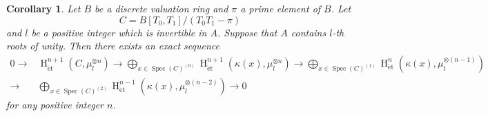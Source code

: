 \documentclass{article}
\newtheorem{cor}[thm]{\indent \sc Corollary}
\newcommand{\spec}{\operatorname{Spec}}
\newcommand{\et}{\mathrm{\acute{e}t}}
\newcommand{\HO}{\operatorname{H}}
\begin{document}
%
\begin{cor}\upshape
Let $B$ be a discrete valuation ring 
and $\pi$ a prime element of $B$.
Let
%
\begin{equation*}
C=B[T_{0}, T_{1}]/(
T_{0}T_{1}-\pi
)    
\end{equation*}
%
and $l$ be a positive integer which is
invertible in $A$.
Suppose that $A$ contains $l$-th roots of unity.
Then there exists an exact sequence
%
\begin{align*}
0\to  
&\HO^{n+1}_{\et}(
C, \mu_{l}^{\otimes n}
)
\to
\displaystyle\bigoplus_{x\in \spec(C)^{(0)}}
\HO^{n+1}_{\et}(
\kappa(x), 
\mu_{l}^{\otimes n}
)
\to
\displaystyle\bigoplus_{x\in \spec(C)^{(1)}}
\HO^{n}_{\et}(
\kappa(x), 
\mu_{l}^{\otimes (n-1)}
)
\\
\to
&\displaystyle\bigoplus_{x\in \spec(C)^{(2)}}
\HO^{n-1}_{\et}(
\kappa(x), 
\mu_{l}^{\otimes (n-2)}
)
\to
0
\end{align*}
%
for any positive integer $n$.
\end{cor}
%
\end{document}
